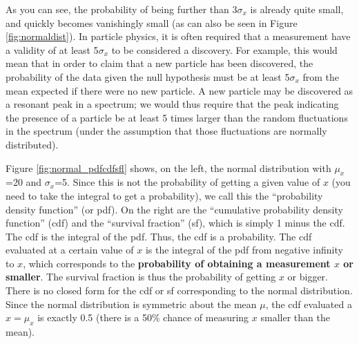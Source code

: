 As you can see, the probability of being further than 3$\sigma_x$ is already quite small, and quickly becomes vanishingly small (as can also be seen in Figure \ref{fig:normaldist}). In particle physics, it is often required that a measurement have a validity of at least 5$\sigma_x$ to be considered a discovery. For example, this would mean that in order to claim that a new particle has been discovered, the probability of the data given the null hypothesis must be at least 5$\sigma_x$ from the mean expected if there were no new particle. A new particle may be discovered as a resonant peak in a spectrum; we would thus require that the peak indicating the presence of a particle be at least 5 times larger than the random fluctuations in the spectrum (under the assumption that those fluctuations are normally distributed).

Figure \ref{fig:normal_pdfcdfsfl} shows, on the left, the normal distribution with $\mu_x$=20 and $\sigma_x$=5. Since this is not the probability of getting a given value of $x$ (you need to take the integral to get a probability), we call this the ``probability density function'' (or pdf). On the right are the ``cumulative probability density function'' (cdf) and the ``survival fraction'' (sf), which is simply 1 minus the cdf. The cdf is the integral of the pdf. Thus, the cdf is a probability. The cdf evaluated at a certain value of $x$ is the integral of the pdf from negative infinity to $x$, which corresponds to the \textbf{probability of obtaining a measurement $x$ or smaller}. The survival fraction is thus the probability of getting $x$ or bigger. There is no closed form for the cdf or sf corresponding to the normal distribution. Since the normal distribution is symmetric about the mean $\mu$, the cdf evaluated a $x=\mu_x$ is exactly 0.5 (there is a 50\% chance of measuring $x$ smaller than the mean).

